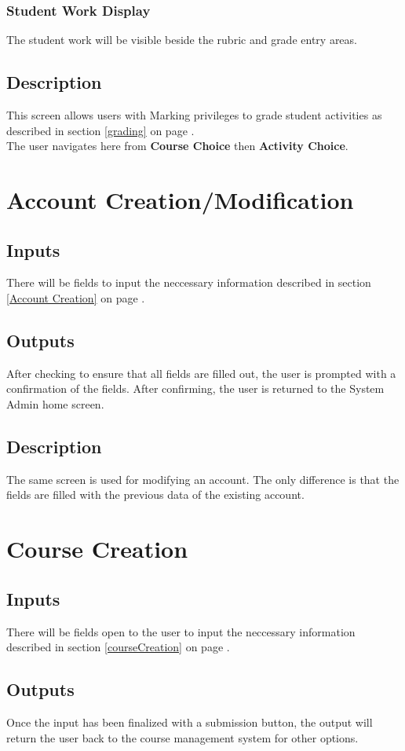 \documentclass{article}
\begin{document}
\subsubsection{Student Work Display}
The student work will be visible beside the rubric and grade entry areas.
\subsection{Description}
This screen allows users with Marking privileges to grade student activities
as described in section \ref{grading} on page \pageref{grading}.\\
The user navigates here from \textbf{Course Choice} then \textbf{Activity Choice}.

\section{Account Creation/Modification}
\subsection{Inputs}
There will be fields to input the neccessary information described
in section \ref{Account Creation} on page \pageref{Account Creation}.
\subsection{Outputs}
After checking to ensure that all fields are filled out, the user is 
prompted with a confirmation of the fields. After confirming, the user 
is returned to the System Admin home screen.
\subsection{Description}
The same screen is used for modifying an account. The only difference is
that the fields are filled with the previous data of the existing account.
\section{Course Creation}
\subsection{Inputs}
There will be fields open to the user to input the neccessary information described
in section \ref{courseCreation} on page \pageref{courseCreation}.
\subsection{Outputs}
Once the input has been finalized with a submission button, the output will return
the user back to the course management system for other options.
\end{document}
